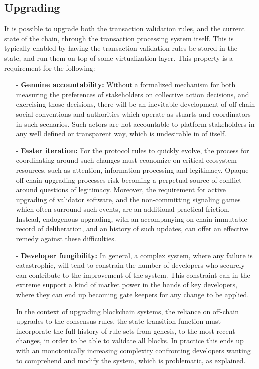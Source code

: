 \documentclass{article}
\begin{document}
\subsection{Upgrading}

It is possible to upgrade both the transaction validation rules, and the current state of the chain, through the transaction processing system itself. This is typically enabled by having the transaction validation rules be stored in the state, and run them on top of some virtualization layer. This property is a requirement for the following:

\begin{itemize}

    \item[-] \textbf{Genuine accountability:} Without a formalized mechanism for both measuring the preferences of stakeholders on collective action decisions, and exercising those decisions, there will be an inevitable development of off-chain social conventions and authorities which operate as stuarts and coordinators in such scenarios. Such actors are not accountable to platform stakeholders in any well defined or transparent way, which is undesirable in of itself.

    \item[-] \textbf{Faster iteration:} For the protocol rules to quickly evolve, the process for coordinating around such changes must economize on critical ecosystem resources, such as attention, information processing and legitimacy. Opaque off-chain upgrading processes risk becoming a perpetual source of conflict around questions of legitimacy. Moreover, the requirement for active upgrading of validator software, and the non-committing signaling games which often surround such events, are an additional practical friction. Instead, endogenous upgrading, with an accompanying on-chain immutable record of deliberation, and an history of such updates, can offer an effective remedy against these difficulties.

    \item[-] \textbf{Developer fungibility:} In general, a complex system, where any failure is catastrophic, will tend to constrain the number of developers who securely can contribute to the improvement of the system. This constraint can in the extreme support a kind of market power in the hands of key developers, where they can end up becoming gate keepers for any change to be applied.

    In the context of upgrading blockchain systems, the reliance on off-chain upgrades to the consensus rules, the state transition function must incorporate the full history of rule sets from genesis, to the most recent changes, in order to be able to validate all blocks. In practice this ends up with an monotonically increasing complexity confronting developers wanting to comprehend and modify the system, which is problematic, as explained.

\end{itemize}
\end{document}
